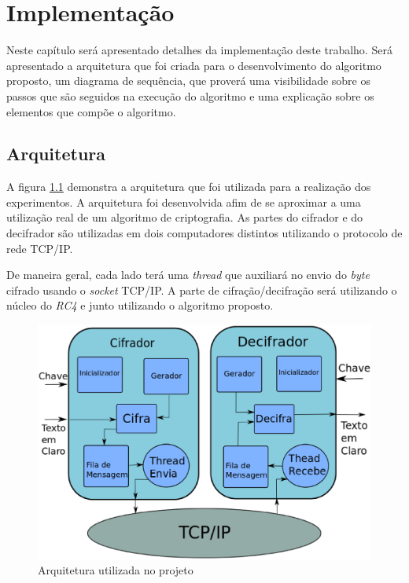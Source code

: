 \chapter{Implementação}
\label{implementation-algorithm}

Neste capítulo será apresentado detalhes da implementação deste trabalho. Será apresentado a arquitetura que foi criada para o desenvolvimento do algoritmo proposto, um diagrama de sequência, que proverá uma visibilidade sobre os passos que são seguidos na execução do algoritmo e uma explicação sobre os elementos que compõe o algoritmo.

\section{Arquitetura}

A figura \ref{architecture} demonstra a arquitetura que foi utilizada para a realização dos experimentos. A arquitetura foi desenvolvida afim de se aproximar a uma utilização real de um algoritmo de criptografia. As partes do cifrador e do decifrador são utilizadas em dois computadores distintos utilizando o protocolo de rede TCP/IP.

De maneira geral, cada lado terá uma \textit{thread} que auxiliará no envio do \textit{byte} cifrado usando o \textit{socket} TCP/IP. A parte de cifração/decifração será utilizando o núcleo do \textit{RC4} e junto utilizando o algoritmo proposto.

\begin{figure}[h]
	\centering
	\includegraphics[scale=0.5]{figuras/architecture.eps}
	\caption{Arquitetura utilizada no projeto}
	\label{architecture}
\end{figure}

